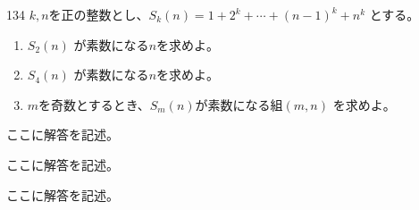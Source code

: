 \begin{thm}{134}{}{}
 $k, n$を正の整数とし、$S_k(n)=1+2^k+\cdots+(n-1)^k+n^k$ とする。
 \begin{enumerate}
  \item $S_2(n)$ が素数になる$n$を求めよ。 
  \item $S_4(n)$ が素数になる$n$を求めよ。 
  \item $m$を奇数とするとき、$S_m(n)$が素数になる組$(m,n)$ を求めよ。 
 \end{enumerate}
\end{thm}

ここに解答を記述。

ここに解答を記述。

ここに解答を記述。